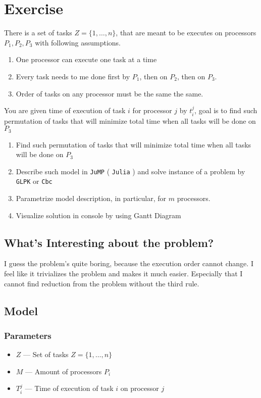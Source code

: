\section{Exercise}
There is a set of tasks $Z = \{1, \dots , n\}$, 
that are meant to be executes on processors $P_1, P_2, P_3$ with following assumptions.
\begin{enumerate}
    \item One processor can execute one task at a time
    \item Every task needs to me done first by $P_1$, then on $P_2$, then on $P_3$.
    \item Order of tasks on any processor must be the same the same.
\end{enumerate}
You are given time of execution of task $i$ for processor $j$ by $t^j_i$,
goal is to find such permutation of tasks that will minimize total time when all tasks will be done on $P_3$
\begin{enumerate}
    \item Find such permutation of tasks that will minimize total time when all tasks will be done on $P_3$ \notdone
    \item Describe such model in \texttt{JuMP} ( \texttt{Julia} ) and solve instance of a problem by \texttt{GLPK} or \texttt{Cbc} \notdone
    \item Parametrize model description, in particular, for $m$ processors. \notdone  
    \item Visualize solution in console by using Gantt Diagram \notdone
\end{enumerate}

\subsection{What's Interesting about the problem?}
I guess the problem's quite boring, because the execution order cannot change. I feel like it trivializes the problem and makes it much easier. 
Especially that I cannot find reduction from the problem without the third rule.

\subsection{Model}
\subsubsection*{Parameters}
\begin{itemize}
    \item $Z$ --- Set of tasks $Z = \{1, \dots , n\}$
    \item $M$ --- Amount of processors $P_i$
    \item $T^j_i$ --- Time of execution of task $i$ on processor $j$
\end{itemize}
